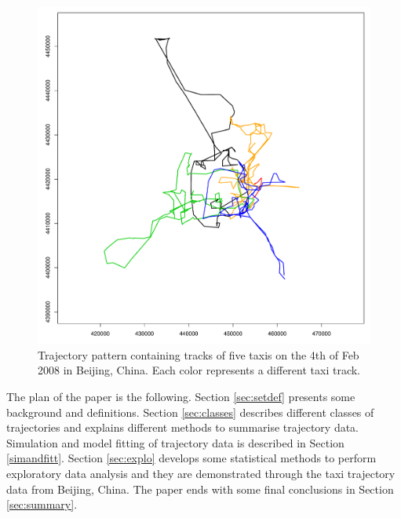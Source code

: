 \documentclass[article]{jss}
\begin{document}
\begin{figure}[!h]
\centering
\includegraphics[width=0.6\linewidth]{Tracks-ex.pdf}
\caption{Trajectory pattern containing tracks of five taxis on the 4th of Feb 2008 in Beijing, China. Each color represents a different taxi track.}
\label{taxitracks}
\end{figure}

The plan of the paper is the following.
Section \ref{sec:setdef} presents some background and definitions.
Section \ref{sec:classes} describes different classes of trajectories and explains different methods to summarise trajectory data. Simulation and model fitting of trajectory data is described in Section \ref{simandfitt}. Section \ref{sec:explo} develops some statistical methods to perform exploratory data analysis and they are demonstrated through the taxi trajectory data from Beijing, China. The paper ends with some final conclusions in Section \ref{sec:summary}.
\end{document}
